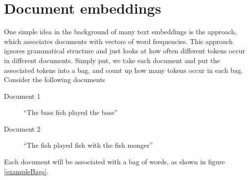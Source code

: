 %
%
%
%

\section{Document embeddings}

One simple idea in the background of many text embeddings is the  approach, which associates documents with vectors of word frequencies. This approach ignores grammatical structure and just looks at how often different tokens occur in different documents.  Simply put, we take each document and put the associated tokens into a bag, and count up how many tokens occur in each bag. Consider the following documents

\begin{description}
\item[Document 1]  ``The bass fish played the bass''
\item[Document 2]  ``The fish played fish with the fish monger''
\end{description}

Each document will be associated with a bag of words, as shown in figure \ref{exampleBags}.

